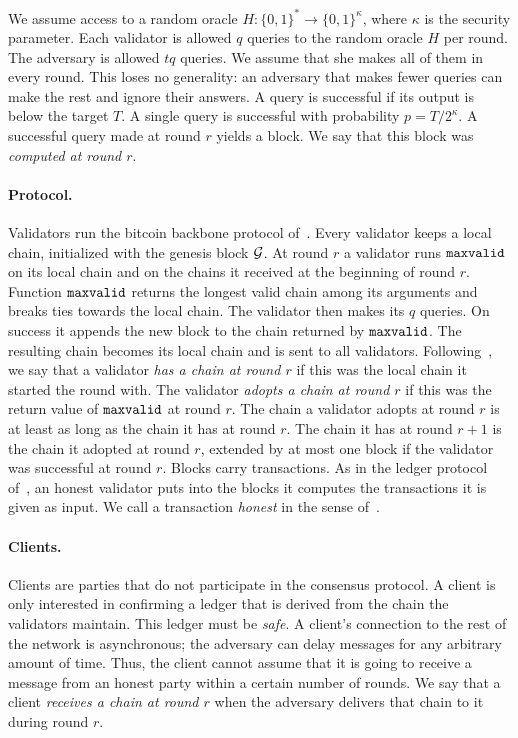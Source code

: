 We assume access to a random oracle $H \colon \{0,1\}^* \to \{0,1\}^\kappa$,
where $\kappa$ is the security parameter. Each validator is allowed $q$ queries
to the random oracle $H$ per round. The adversary is allowed $tq$ queries. We
assume that she makes all of them in every round. This loses no generality: an
adversary that makes fewer queries can make the rest and ignore their answers. A
query is successful if its output is below the target $T$. A single query is
successful with probability $p=T/2^\kappa$. A successful query made at round $r$
yields a block. We say that this block was \emph{computed at round $r$}.

\paragraph{Protocol.}

Validators run the bitcoin backbone protocol of~\cite{gkl24}. Every validator
keeps a local chain, initialized with the genesis block $\mathcal{G}$. At round $r$ a
validator runs $\mathtt{maxvalid}$ on its local chain and on the chains it received
at the beginning of round $r$. Function $\mathtt{maxvalid}$ returns the longest
valid chain among its arguments and breaks ties towards the local chain. The
validator then makes its $q$ queries. On success it appends the new block to the
chain returned by $\mathtt{maxvalid}$. The resulting chain becomes its local chain
and is sent to all validators. Following~\cite{gkl24}, we say that a validator
\emph{has a chain at round $r$} if this was the local chain it started the round
with. The validator \emph{adopts a chain at round $r$} if this was the return
value of $\mathtt{maxvalid}$ at round $r$. The chain a validator adopts at round
$r$ is at least as long as the chain it has at round $r$. The chain it has at
round $r+1$ is the chain it adopted at round $r$, extended by at most one block
if the validator was successful at round $r$. Blocks carry transactions. As in
the ledger protocol of~\cite[Section~6]{gkl24}, an honest validator puts into
the blocks it computes the transactions it is given as input. We call a
transaction \emph{honest} in the sense of~\cite[Definition~6.1]{gkl24}.

\paragraph{Clients.}

Clients are parties that do not participate in the consensus protocol. A client
is only interested in confirming a ledger that is derived from the chain the
validators maintain. This ledger must be \emph{safe}. A client's connection to
the rest of the network is asynchronous; the adversary can delay messages for
any arbitrary amount of time. Thus, the client cannot assume that it is
going to receive a message from an honest party within a certain number of
rounds. We say that a client \emph{receives a chain at round $r$} when the
adversary delivers that chain to it during round $r$.

